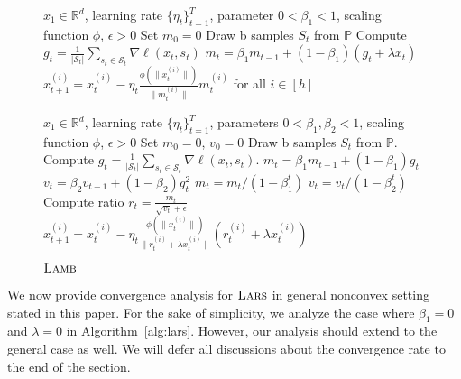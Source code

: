 \documentclass{article} \usepackage{iclr2020_conference,times}
\newcommand{\lamb}{\textsc{Lamb}}
\newcommand{\lars}{\textsc{Lars}}
\begin{document}
\begin{figure}
\begin{minipage}[b]{.48\textwidth}
\begin{algorithm}[H]\small
	\caption{$\lars$}
	\label{alg:lars}
	\begin{algorithmic}
		 $x_1 \in \mathbb{R}^d$, learning rate $\{\eta_t\}_{t=1}^T$, parameter $0 < \beta_{1} < 1$, scaling function $\phi$, $\epsilon > 0$
		\STATE Set $m_{0} = 0$
		\STATE Draw b samples $S_t$ from $\mathbb{P}$
        \STATE Compute $g_t = \frac{1}{|\mathcal{S}_t|} \sum_{s_t \in \mathcal{S}_t}\nabla \ell(x_t, s_t)$
        \STATE $m_{t} = \beta_{1} m_{t-1} + (1 - \beta_{1}) (g_{t} + \lambda x_t)$
		\STATE $x_{t+1}^{(i)} = x_{t}^{(i)} - \eta_t \frac{\phi(\|x_t^{(i)}\|)}{\|m_t^{(i)}\|} m_t^{(i)}$ for all $i \in [h]$
		\ENDFOR
	\end{algorithmic}
\end{algorithm}
\end{minipage}\hfill \begin{minipage}[b]{.5\textwidth}
\begin{algorithm}[H]\small
	\caption{$\lamb$}
	\label{alg:lamb}
	\begin{algorithmic}
		 $x_1 \in \mathbb{R}^d$, learning rate $\{\eta_t\}_{t=1}^T$,  parameters $0 < \beta_{1}, \beta_2 < 1$, scaling function $\phi$, $\epsilon > 0$
		\STATE Set $m_{0} = 0$, $v_{0} = 0$
		\FOR{$t=1$ {\bf to} $T$}
		\STATE Draw b samples $S_t$ from $\mathbb{P}$.
        \STATE Compute $g_t = \frac{1}{|\mathcal{S}_t|} \sum_{s_t \in \mathcal{S}_t}\nabla \ell(x_t, s_t)$.
		\STATE  $m_{t} = \beta_{1} m_{t-1} + (1 - \beta_{1}) g_{t}$ 
		\STATE  $v_{t} = \beta_{2} v_{t-1} + (1 - \beta_{2}) g_{t}^2$
		\STATE $m_t = m_t/(1 - {\beta}_1^t)$ 
        \STATE $v_t = v_t/(1 - {\beta}_2^t)$
		\STATE Compute ratio $r_t = \frac{m_t}{\sqrt{v_t} + \epsilon}$
		\STATE $x_{t+1}^{(i)} = x_{t}^{(i)} - \eta_t \frac{\phi(\|x_t^{(i)}\|)}{\|r_t^{(i)} + \lambda x_t^{(i)}\|} (r_t^{(i)} + \lambda x_t^{(i)})$
		\ENDFOR
	\end{algorithmic}
\end{algorithm}
\end{minipage}
\end{figure}

We now provide convergence analysis for $\lars$ in general nonconvex setting stated in this paper. For the sake of simplicity, we analyze the case where $\beta_1 = 0$ and $\lambda = 0$ in Algorithm~\ref{alg:lars}. However, our analysis should extend to the general case as well. We will defer all discussions about the convergence rate to the end of the section.
\end{document}
